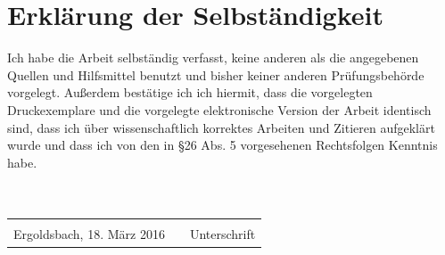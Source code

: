 \documentclass[abstracton]{scrreprt}
\begin{document}



\chapter*{Erkl\"arung der Selbst\"andigkeit}

    Ich habe die Arbeit selbst\"andig verfasst, keine anderen als die angegebenen Quellen und Hilfsmittel benutzt und bisher keiner anderen Prüfungsbeh\"orde vorgelegt. Außerdem best\"atige ich ich hiermit, dass die vorgelegten Druckexemplare und die vorgelegte elektronische Version der Arbeit identisch sind, dass ich über wissenschaftlich korrektes Arbeiten und Zitieren aufgekl\"art wurde und dass ich von den in \S 26 Abs. 5 vorgesehenen Rechtsfolgen Kenntnis habe.\\\\\\

    \begin{center}
        \begin{tabular}{lp{8em}l} 
            \hspace{5cm}   && \hspace{5cm} \\\cline{1-1}\cline{3-3} 
            Ergoldsbach, 18. M\"arz 2016     && Unterschrift 
        \end{tabular}
    \end{center}
\end{document}
